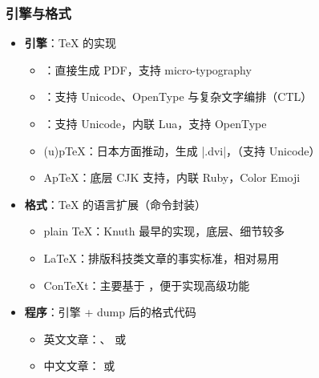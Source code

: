 
\begin{frame}[fragile]
  \frametitle{引擎与格式}
  \begin{itemize}
    \item \textbf{引擎}：\TeX{} 的实现

      \begin{itemize}
        \item \pdfTeX{}：直接生成 PDF，支持 micro-typography
        \item \XeTeX{}：支持 Unicode、OpenType 与复杂文字编排（CTL）
        \item \LuaTeX{}：支持 Unicode，内联 Lua，支持 OpenType
        \item (u)p\TeX{}：日本方面推动，生成 |.dvi|，（支持 Unicode）
        \item Ap\TeX{}：底层 CJK 支持，内联 Ruby，Color Emoji
      \end{itemize}

    \item \textbf{格式}：\TeX{} 的语言扩展（命令封装）

      \begin{itemize}
        \item plain \TeX{}：Knuth 最早的实现，底层、细节较多
        \item \LaTeX{}：排版科技类文章的事实标准，相对易用
        \item Con\TeX t：主要基于 \LuaTeX{}，便于实现高级功能
      \end{itemize}

    \item \textbf{程序}：引擎 + dump 后的格式代码

      \begin{itemize}
        \item \alert{英文文章：\pdfLaTeX{}、\XeLaTeX{} 或 \LuaLaTeX{}}
        \item \alert{中文文章：\XeLaTeX{} 或 \LuaLaTeX{}}
      \end{itemize}
  \end{itemize}
\end{frame}

